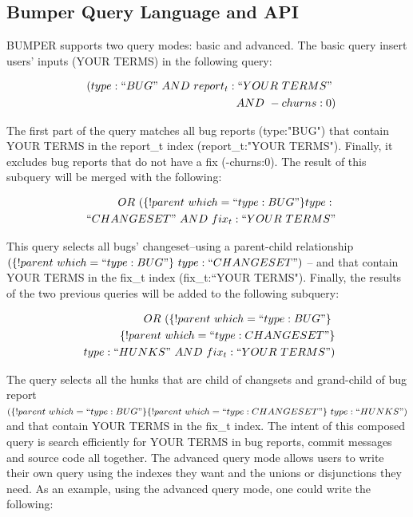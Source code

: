 \documentclass[conference]{IEEEtran}
\begin{document}
\subsection{Bumper Query Language and API}
\label{sub:Bumper Query Language and API}

BUMPER supports two query modes: basic and advanced.
The basic query insert users' inputs (YOUR TERMS) in the
following query:

\begin{equation}
\begin{split}
~~(type:``BUG"~AND~report_t:``YOUR~TERMS"~\\
~~AND~-churns:0)
\end{split}
\end{equation}



The first part of the query matches all bug reports
(type:"BUG") that contain YOUR TERMS in the report\_t index
(report\_t:"YOUR TERMS").
Finally, it excludes bug reports that
do not have a fix (-churns:0).
The result of this subquery will be
merged with the following:

\begin{equation}
\begin{split}
~~OR~(\{!parent~which=``type:BUG"\}type:~\\
~~``CHANGESET"~AND~fix_t:``YOUR~TERMS"
\end{split}
\end{equation}

This query selects all bugs' changeset--using a parent-child
relationship $(\{!parent~which=``type:BUG"\}~type:
  ``CHANGESET")$ -- and that contain YOUR TERMS in the fix\_t
  index (fix\_t:``YOUR TERMS").
Finally, the results of the two
previous queries will be added to the following subquery:

\begin{equation}
\begin{split}
  OR~(\{!parent~which=``type:BUG"\}\ \\
~\{!parent~which=``type:CHANGESET"\}\\
~type:``HUNKS"~AND~fix_t:``YOUR~TERMS")
\end{split}
\end{equation}

The query selects all the hunks that are child of changsets and
grand-child of bug report $ (\{!parent~which=``type:BUG"\}
  \{!parent~which=``type:CHANGESET"\}~type:``HUNKS")$
and that
contain YOUR TERMS in the fix\_t index.
The intent of this composed query is search efficiently for
YOUR TERMS in bug reports, commit messages and source
code all together.
The advanced query mode allows users to write their own
query using the indexes they want and the unions or disjunctions
they need.
As an example, using the advanced query mode, one
could write the following:
\end{document}
